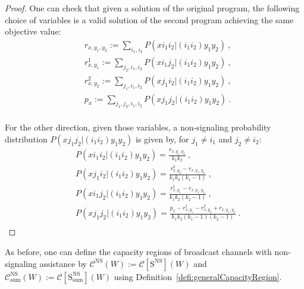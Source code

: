 \begin{proof}
  One can check that given a solution of the original program, the following choice of variables is a valid solution of the second program achieving the same objective value:
\begin{equation}
  \begin{aligned}
    &r_{x,y_1,y_2} := \sum_{i_1,i_2} P(xi_1i_2|(i_1i_2)y_1y_2)\ ,\\
    &r^1_{x,y_1} := \sum_{j_2,i_1,i_2} P(xi_1j_2|(i_1i_2)y_1y_2)\ ,\\
    &r^2_{x,y_2} := \sum_{j_1,i_1,i_2} P(xj_1i_2|(i_1i_2)y_1y_2)\ ,\\
    &p_x := \sum_{j_1,j_2,i_1,i_2} P(xj_1j_2|(i_1i_2)y_1y_2) \ .\\
  \end{aligned}
\end{equation}

For the other direction, given those variables, a non-signaling probability distribution $P(xj_1j_2|(i_1i_2)y_1y_2)$ is given by, for $j_1 \not= i_1$ and $j_2 \not= i_2$:
\begin{equation}
  \begin{aligned}
    &P(xi_1i_2|(i_1i_2)y_1y_2) = \frac{r_{x,y_1,y_2}}{k_1k_2}  \ ,\\
    &P(xj_1i_2|(i_1i_2)y_1y_2) = \frac{r^2_{x,y_2} - r_{x,y_1,y_2}}{k_1k_2(k_1-1)}  \ ,\\
    &P(xi_1j_2|(i_1i_2)y_1y_2) = \frac{r^1_{x,y_1} - r_{x,y_1,y_2}}{k_1k_2(k_2-1)} \ ,\\
    &P(xj_1j_2|(i_1i_2)y_1y_2) = \frac{p_{x} -  r^1_{x,y_1} - r^2_{x,y_2} + r_{x,y_1,y_2}}{k_1k_2(k_1-1)(k_2-1)} \ .\\
  \end{aligned}
\end{equation}
\end{proof}

As before, one can define the capacity regions of broadcast channels with non-signaling assistance by $\mathcal{C}^{\mathrm{NS}}(W) :=  \mathcal{C}[\mathrm{S}^{\mathrm{NS}}](W)$ and $\mathcal{C}^{\mathrm{NS}}_{\text{sum}}(W) := \mathcal{C}[\mathrm{S}^{\mathrm{NS}}_{\text{sum}}](W)$ using Definition~\ref{defi:generalCapacityRegion}. 


